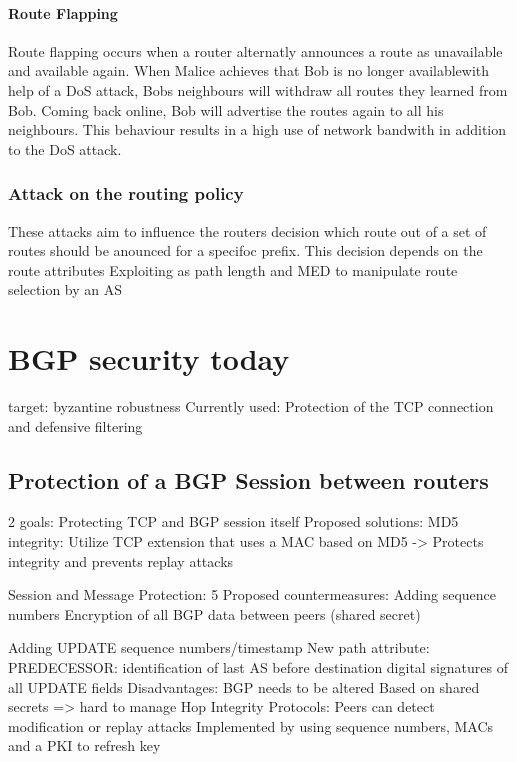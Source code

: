 \documentclass[12pt]{IEEEtran}
\begin{document}
		\paragraph{Route Flapping}
		Route flapping occurs when a router alternatly announces a route as unavailable and available again. When Malice achieves that Bob is no longer availablewith help of a DoS attack, Bobs neighbours will withdraw all routes they learned from Bob. Coming back online, Bob will advertise the routes again to all his neighbours.
		This behaviour results in a high use of network bandwith in addition to the DoS attack. 

		\subsubsection{Attack on the routing policy} 

		These attacks aim to influence the routers decision which route out of a set of routes should be anounced for a specifoc prefix. This decision depends on the route attributes 
		Exploiting as path length and MED to manipulate route selection by an AS



       \section{BGP security today}
	target:	byzantine robustness
	Currently used: Protection of the TCP connection and defensive filtering
	


	\subsection{Protection of a BGP Session between routers}
	2 goals: Protecting TCP and BGP session itself
		Proposed solutions:
			MD5 integrity: Utilize TCP extension that uses a MAC based on MD5
					-> Protects integrity and prevents replay attacks

			Session and Message Protection:
				5 Proposed countermeasures:
					Adding sequence numbers
					Encryption of all BGP data between peers (shared secret)
					
					Adding UPDATE sequence numbers/timestamp
					New path attribute: PREDECESSOR: identification of last AS before destination
					digital signatures of all UPDATE fields
				Disadvantages: BGP needs to be altered
					       Based on shared secrets => hard to manage
			Hop Integrity Protocols:
				Peers can detect modification or replay attacks	
				Implemented by using sequence numbers, MACs and a PKI to refresh key
\end{document}
